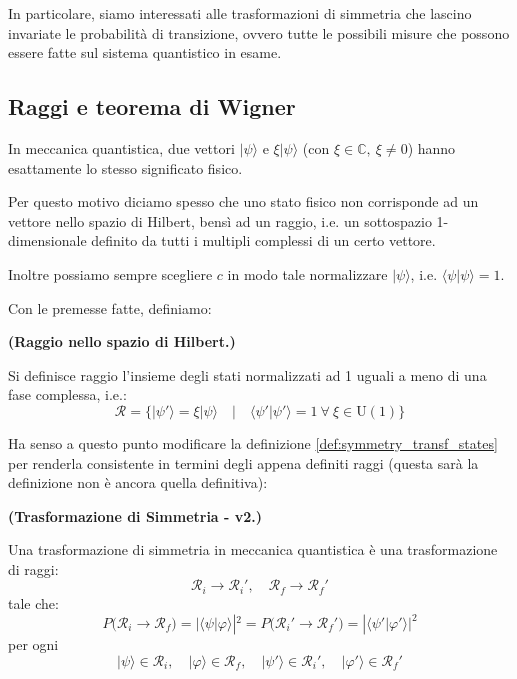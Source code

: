 \documentclass[../main.tex]{subfiles}
\begin{document}
In particolare, siamo interessati alle trasformazioni di simmetria che lascino invariate le probabilità di transizione, ovvero tutte le possibili misure che possono essere fatte sul sistema quantistico in esame.

\subsection{Raggi e teorema di Wigner}
In meccanica quantistica, due vettori \(|\psi\rangle\) e \(\xi|\psi\rangle\) (con \(\xi \in \mathbb C,~ \xi\neq0\)) hanno esattamente lo stesso significato fisico.

Per questo motivo diciamo spesso che uno stato fisico non corrisponde ad un vettore nello spazio di Hilbert, bensì ad un raggio, i.e. un sottospazio 1-dimensionale definito da tutti i multipli complessi di un certo vettore.

Inoltre possiamo sempre scegliere \(c\) in modo tale normalizzare \(|\psi\rangle\), i.e. \(\langle\psi|\psi\rangle = 1\). 

Con le premesse fatte, definiamo:

\begin{definition}
    \textbf{(Raggio nello spazio di Hilbert.)}

    Si definisce raggio l'insieme degli stati normalizzati ad 1 uguali a meno di una fase complessa, i.e.:
    \[
    \mathscr R = \Big\{|\psi'\rangle = \xi|\psi\rangle \quad \big| \quad \langle\psi'|\psi'\rangle = 1 ~ \forall~ \xi\in \text{U}(1)\Big\}
    \]
    \label{def:Ray}
\end{definition}

Ha senso a questo punto modificare la definizione \ref{def:symmetry_transf_states} per renderla consistente in termini degli appena definiti raggi (questa sarà la definizione non è ancora quella definitiva):

\begin{definition}
    \textbf{(Trasformazione di Simmetria - v2.)}

    Una trasformazione di simmetria in meccanica quantistica è una trasformazione di raggi:
    \[
    \mathscr R_i \rightarrow \mathscr R_i', \quad \mathscr R_f \rightarrow \mathscr R_f'
    \]
    tale che:
    \[
    P\big(\mathscr R_i \rightarrow \mathscr R_f\big) = | \langle\psi|\varphi\rangle |^2 = P\big(\mathscr R_i' \rightarrow \mathscr R_f'\big) = | \langle\psi'|\varphi'\rangle |^2
    \]
    per ogni\[
    |\psi\rangle \in \mathscr R_i, \quad |\varphi\rangle \in \mathscr R_f, \quad |\psi'\rangle \in \mathscr R_i', \quad |\varphi'\rangle \in \mathscr R_f'
    \]
    \label{def:symmetry_transf_rays}
\end{definition}
\end{document}
